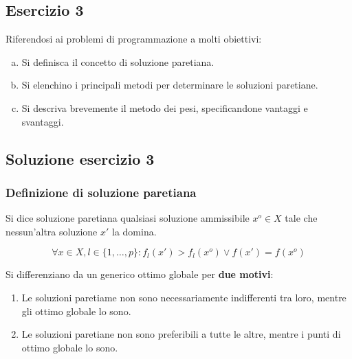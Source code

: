 \documentclass[\main/main.tex]{subfiles}
\begin{document}
\subsection{Esercizio 3}
Riferendosi ai problemi di programmazione a molti obiettivi:

\begin{enumerate}[a)]
  \item Si definisca il concetto di soluzione paretiana.
  \item Si elenchino i principali metodi per determinare le soluzioni paretiane.
  \item Si descriva brevemente il metodo dei pesi, specificandone vantaggi e svantaggi.
\end{enumerate}

\subsection{Soluzione esercizio 3}
\subsubsection*{Definizione di soluzione paretiana}
\begin{definition}
  Si dice soluzione paretiana qualsiasi soluzione ammissibile $x^o \in X$ tale che nessun’altra soluzione $x'$ la domina.

  \[
    \forall x \in X, l \in \{1,\ldots,p\}: f_l(x') > f_l(x^o) \lor f(x') = f(x^o)
  \]

  Si differenziano da un generico ottimo globale per \textbf{due motivi}:
  \begin{enumerate}
    \item Le soluzioni paretiame non sono necessariamente indifferenti tra loro, mentre gli ottimo globale lo sono.
    \item Le soluzioni paretiane non sono preferibili a tutte le altre, mentre i punti di ottimo globale lo sono.
  \end{enumerate}
\end{definition}
\end{document}
